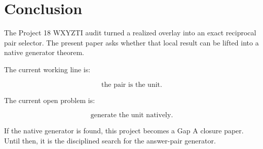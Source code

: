 \section{Conclusion}

The Project 18 WXYZTI audit turned a realized overlay into an exact reciprocal pair selector. The present paper asks whether that local result can be lifted into a native generator theorem.

The current working line is:

\[
\text{the pair is the unit.}
\]

The current open problem is:

\[
\text{generate the unit natively.}
\]

If the native generator is found, this project becomes a Gap A closure paper. Until then, it is the disciplined search for the answer-pair generator.
